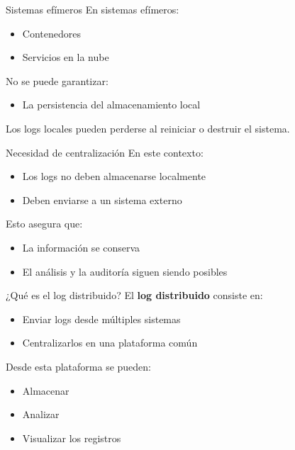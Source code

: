 \documentclass{beamer}
\begin{document}
\begin{frame}{Sistemas efímeros}
En sistemas efímeros:
\begin{itemize}
    \item Contenedores
    \item Servicios en la nube
\end{itemize}

\vspace{0.3cm}
No se puede garantizar:
\begin{itemize}
    \item La persistencia del almacenamiento local
\end{itemize}

\vspace{0.3cm}
Los logs locales pueden perderse al reiniciar o destruir el sistema.
\end{frame}

\begin{frame}{Necesidad de centralización}
En este contexto:
\begin{itemize}
    \item Los logs no deben almacenarse localmente
    \item Deben enviarse a un sistema externo
\end{itemize}

\vspace{0.3cm}
Esto asegura que:
\begin{itemize}
    \item La información se conserva
    \item El análisis y la auditoría siguen siendo posibles
\end{itemize}
\end{frame}

\begin{frame}{¿Qué es el log distribuido?}
El \textbf{log distribuido} consiste en:
\begin{itemize}
    \item Enviar logs desde múltiples sistemas
    \item Centralizarlos en una plataforma común
\end{itemize}

\vspace{0.3cm}
Desde esta plataforma se pueden:
\begin{itemize}
    \item Almacenar
    \item Analizar
    \item Visualizar los registros
\end{itemize}
\end{frame}
\end{document}

